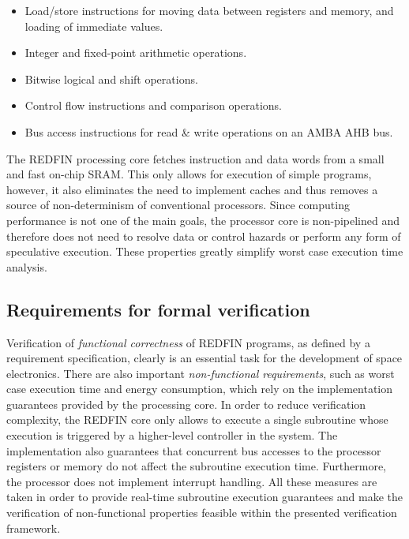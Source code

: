\begin{itemize}
\item{Load/store instructions for moving data between registers and memory, and
loading of immediate values.}
\item{Integer and fixed-point arithmetic operations.}
\item{Bitwise logical and shift operations.}
\item{Control flow instructions and comparison operations.}
\item{Bus access instructions for read \& write operations on an AMBA AHB bus.}
\end{itemize}

The REDFIN processing core fetches instruction and data words from a small and fast
on-chip SRAM. This only allows for execution of simple programs, however, it also
eliminates the need to implement caches and thus removes a source of non-determinism of
conventional processors. Since computing performance is not one of the main goals, the
processor core is non-pipelined and therefore does not need to resolve data or control
hazards or perform any form of speculative execution. These properties greatly simplify
worst case execution time analysis.


\subsection{Requirements for formal verification}


Verification of \emph{functional correctness} of REDFIN programs, as defined by a
requirement specification, clearly is an essential task for the development of space
electronics. There are also important \emph{non-functional requirements}, such as
worst case execution time and energy consumption, which rely on the implementation
guarantees provided by the processing core. In order to reduce verification complexity,
the REDFIN core only allows to execute a single subroutine whose execution is triggered
by a higher-level controller in the system. The implementation also guarantees
that concurrent bus accesses to the processor registers or memory do not affect
the subroutine execution time. Furthermore, the processor does not implement
interrupt handling. All these measures are taken in order to provide real-time
subroutine execution guarantees and make the verification of non-functional
properties feasible within the presented verification framework.

